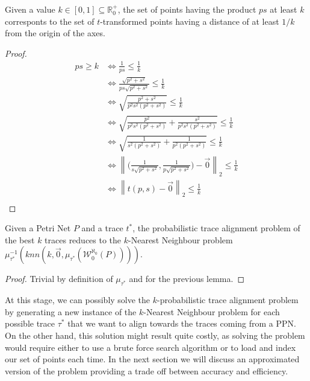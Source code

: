 \begin{lemma}
Given a value $k\in[0,1]\subseteq \mathbb{R}^+_0$, the set of points having the product $ps$ at least $k$ corresponts to the set of $t$-transformed points having a distance of at least $1/k$ from the origin of the axes.
\end{lemma}
\begin{proof}
\[\begin{aligned}
ps\geq k&\Leftrightarrow \frac{1}{ps}\leq\frac{1}{k} \\
	   &\Leftrightarrow \frac{\sqrt{p^2+s^2}}{ps\sqrt{p^2+s^2}}\leq\frac{1}{k} \\
	   &\Leftrightarrow \sqrt{\frac{p^2+s^2}{p^2s^2(p^2+s^2)}}\leq\frac{1}{k} \\
	   &\Leftrightarrow \sqrt{\frac{p^2}{p^2s^2(p^2+s^2)}+\frac{s^2}{p^2s^2(p^2+s^2)}}\leq\frac{1}{k} \\
	   &\Leftrightarrow \sqrt{\frac{1}{s^2(p^2+s^2)}+\frac{1}{p^2(p^2+s^2)}}\leq\frac{1}{k} \\
	   &\Leftrightarrow \left\|{\biggr({\frac{1}{s\sqrt{p^2+s^2}},\frac{1}{p\sqrt{p^2+s^2}}\biggr)}-\vec{0}}\right\|_2\leq\frac{1}{k} \\
	   &\Leftrightarrow \left\|t(p,s)-\vec{0}\right\|_2\leq\frac{1}{k} \\
\end{aligned}\]
\end{proof}
\begin{lemma}
Given a Petri Net $P$ and a trace $t^*$, the probabilistic trace alignment problem of the best $k$ traces reduces to the $k$-Nearest Neighbour problem $\mu_{\tau^*}^{-1}(knn(k,\vec{0},\mu_{\tau^*}(\mathcal{W}_0^{\aleph_0}(P))))$.
\end{lemma}
\begin{proof}
Trivial by definition of $\mu_{\tau^*}$ and for the previous lemma.
\end{proof}

At this stage, we can possibly solve the $k$-probabilistic trace alignment problem by generating a new instance of the $k$-Nearest Neighbour problem for each possible trace $\tau^*$ that we want to align towards the traces coming from a PPN. On the other hand, this solution might result quite costly, as solving the problem would require either to use a brute force search algorithm or to load and index our set of points each time. In the next section we will discuss an approximated version of the problem providing a trade off between accuracy and efficiency.


